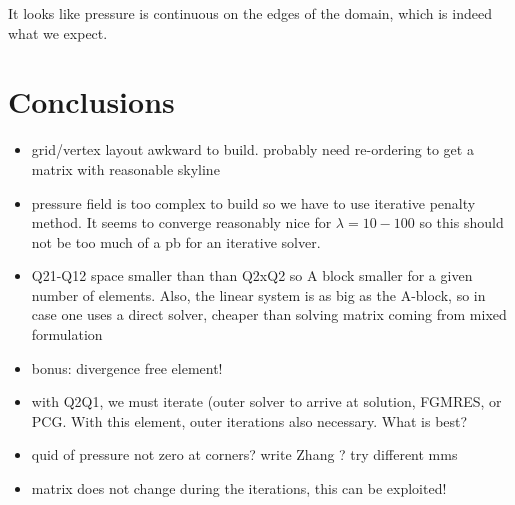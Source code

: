 It looks like pressure is continuous on the edges of the domain, 
which is indeed what we expect.


\section*{Conclusions}

\begin{itemize}

\item grid/vertex layout awkward to build. probably need re-ordering to 
get a matrix with reasonable skyline

\item pressure field is too complex to build so we have to use iterative penalty method. 
It seems to converge reasonably nice for $\lambda=10-100$ so this should not 
be too much of a pb for an iterative solver.

\item Q21-Q12 space smaller than than Q2xQ2 so A block smaller for a given number 
of elements. Also, the linear system is as big as the A-block, so in case one uses 
a direct solver, cheaper than solving matrix coming from mixed formulation

\item bonus: divergence free element!

\item with Q2Q1, we must iterate (outer solver to arrive at solution, FGMRES, or PCG. 
With this element, outer iterations also necessary. What is best?

\item quid of pressure not zero at corners? write Zhang ? try different mms 

\item matrix does not change during the iterations, this can be exploited!

\end{itemize}

